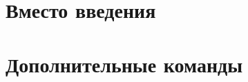 

\teachermode







\tableofcontents

\clearpage


\section*{Вместо введения}
















\section{Дополнительные команды}





